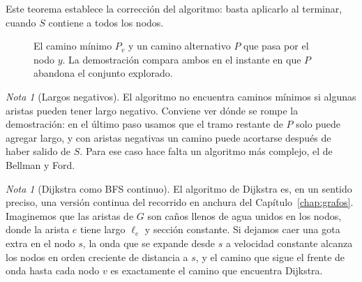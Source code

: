 \documentclass[12pt, spanish, oneside, openany]{book}
\theoremstyle{uprightplain}
\theoremstyle{definition}
\theoremstyle{remark}
\newtheorem{nota}[teorema]{Nota}
\theoremstyle{definition}
\begin{document}
Este teorema establece la corrección del algoritmo: basta aplicarlo al terminar, cuando $S$ contiene a todos los nodos.

\begin{figure}[H]
\centering
{}
\caption{El camino mínimo $P_v$ y un camino alternativo $P$ que pasa por el
nodo $y$. La demostración compara ambos en el instante en que $P$ abandona el
conjunto explorado.}
\label{fig:dijkstra-alternativo}
\end{figure}

\begin{nota}[Largos negativos]
El algoritmo no encuentra caminos mínimos si algunas aristas pueden tener largo negativo. Conviene ver dónde se rompe la demostración: en el último paso usamos que el tramo restante de $P$ solo puede agregar largo, y con aristas negativas un camino puede acortarse después de haber salido de $S$. Para ese caso hace falta un algoritmo más complejo, el de Bellman y Ford.
\end{nota}

\begin{nota}[Dijkstra como BFS continuo]
El algoritmo de Dijkstra es, en un sentido preciso, una versión continua del recorrido en anchura del Capítulo~\ref{chap:grafos}. Imaginemos que las aristas de $G$ son caños llenos de agua unidos en los nodos, donde la arista $e$ tiene largo $\ell_e$ y sección constante. Si dejamos caer una gota extra en el nodo $s$, la onda que se expande desde $s$ a velocidad constante alcanza los nodos en orden creciente de distancia a $s$, y el camino que sigue el frente de onda hasta cada nodo $v$ es exactamente el camino que encuentra Dijkstra.
\end{nota}
\end{document}
